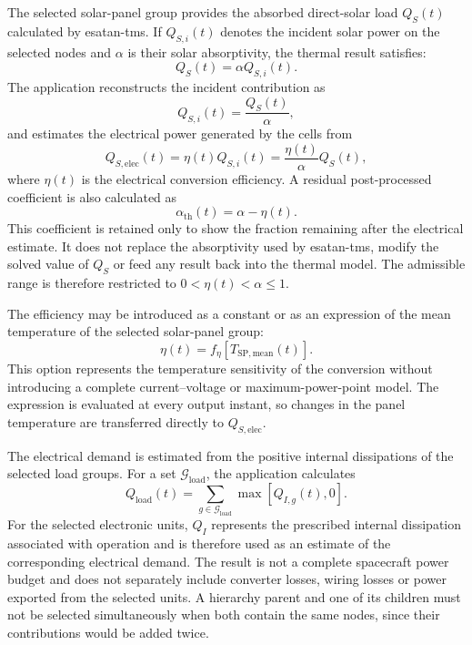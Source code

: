 The selected solar-panel group provides the absorbed direct-solar load
$Q_S(t)$ calculated by \acrshort{esatan-tms}. If $Q_{S,i}(t)$ denotes the
incident solar power on the selected nodes and $\alpha$ is their solar
absorptivity, the thermal result satisfies:
\begin{equation}
    Q_S(t)=\alpha Q_{S,i}(t).
    \label{eq:solar_absorbed_power_ch8}
\end{equation}
The application reconstructs the incident contribution as
\begin{equation}
    Q_{S,i}(t)=\frac{Q_S(t)}{\alpha},
    \label{eq:solar_incident_power_ch8}
\end{equation}
and estimates the electrical power generated by the cells from
\begin{equation}
    Q_{S,\mathrm{elec}}(t)
    =
    \eta(t)Q_{S,i}(t)
    =
    \frac{\eta(t)}{\alpha}Q_S(t),
    \label{eq:solar_electrical_power_ch8}
\end{equation}
where $\eta(t)$ is the electrical conversion efficiency. A residual
post-processed coefficient is also calculated as
\begin{equation}
    \alpha_{\mathrm{th}}(t)=\alpha-\eta(t).
    \label{eq:solar_effective_thermal_absorptivity_ch8}
\end{equation}
This coefficient is retained only to show the fraction remaining after the
electrical estimate. It does not replace the absorptivity used by
\acrshort{esatan-tms}, modify the solved value of $Q_S$ or feed any result back
into the thermal model. The admissible range is therefore restricted to
$0<\eta(t)<\alpha\leq1$.

The efficiency may be introduced as a constant or as an expression of the
mean temperature of the selected solar-panel group:
\begin{equation}
    \eta(t)=f_{\eta}\!\left[T_{\mathrm{SP,mean}}(t)\right].
    \label{eq:solar_efficiency_temperature_ch8}
\end{equation}
This option represents the temperature sensitivity of the conversion without
introducing a complete current--voltage or maximum-power-point model. The
expression is evaluated at every output instant, so changes in the panel
temperature are transferred directly to $Q_{S,\mathrm{elec}}$.

The electrical demand is estimated from the positive internal dissipations of
the selected load groups. For a set $\mathcal{G}_{\mathrm{load}}$, the
application calculates
\begin{equation}
    Q_{\mathrm{load}}(t)
    =
    \sum_{g\in\mathcal{G}_{\mathrm{load}}}
    \max\!\left[Q_{I,g}(t),0\right].
    \label{eq:electrical_load_ch8}
\end{equation}
For the selected electronic units, $Q_I$ represents the prescribed internal
dissipation associated with operation and is therefore used as an estimate of
the corresponding electrical demand. The result is not a complete spacecraft
power budget and does not separately include converter losses, wiring losses
or power exported from the selected units. A hierarchy parent and one of its
children must not be selected simultaneously when both contain the same nodes,
since their contributions would be added twice.

